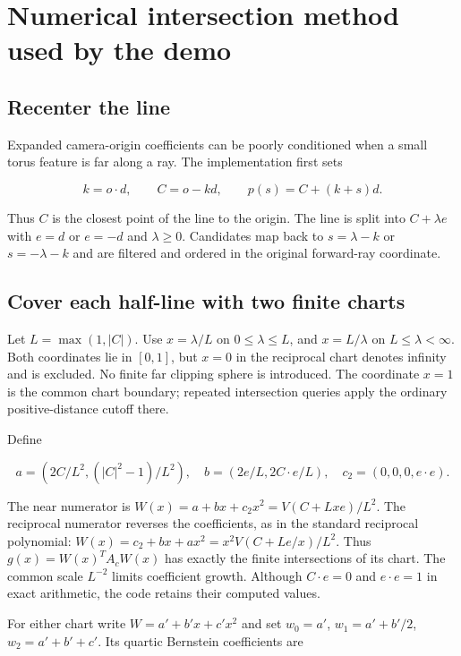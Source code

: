 \documentclass[11pt,a4paper]{article}
\begin{document}
\section{Numerical intersection method used by the
demo}\label{numerical-intersection-method-used-by-the-demo}

\subsection{Recenter the line}\label{recenter-the-line}

Expanded camera-origin coefficients can be poorly conditioned when a
small torus feature is far along a ray. The implementation first sets

\[
k=o\cdot d,\qquad C=o-kd,\qquad p(s)=C+(k+s)d.
\]

Thus \(C\) is the closest point of the line to the origin. The line is
split into \(C+\lambda e\) with \(e=d\) or \(e=-d\) and
\(\lambda\geq0\). Candidates map back to \(s=\lambda-k\) or
\(s=-\lambda-k\) and are filtered and ordered in the original
forward-ray coordinate.

\subsection{Cover each half-line with two finite
charts}\label{cover-each-half-line-with-two-finite-charts}

Let \(L=\max(1,|C|)\). Use \(x=\lambda/L\) on \(0\leq\lambda\leq L\),
and \(x=L/\lambda\) on \(L\leq\lambda<\infty\). Both coordinates lie in
\([0,1]\), but \(x=0\) in the reciprocal chart denotes infinity and is
excluded. No finite far clipping sphere is introduced. The coordinate
\(x=1\) is the common chart boundary; repeated intersection queries
apply the ordinary positive-distance cutoff there.

Define

\[
a=(2C/L^2,(|C|^2-1)/L^2),\quad
b=(2e/L,2C\cdot e/L),\quad c_2=(0,0,0,e\cdot e).
\]

The near numerator is \(W(x)=a+bx+c_2x^2=V(C+Lxe)/L^2\). The reciprocal
numerator reverses the coefficients, as in the standard reciprocal
polynomial: \(W(x)=c_2+bx+ax^2=x^2V(C+Le/x)/L^2\). Thus
\(g(x)=W(x)^TA_cW(x)\) has exactly the finite intersections of its
chart. The common scale \(L^{-2}\) limits coefficient growth. Although
\(C\cdot e=0\) and \(e\cdot e=1\) in exact arithmetic, the code retains
their computed values.

For either chart write \(W=a'+b'x+c'x^2\) and set \(w_0=a'\),
\(w_1=a'+b'/2\), \(w_2=a'+b'+c'\). Its quartic Bernstein coefficients
are
\end{document}
